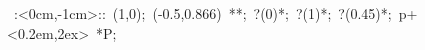 

\hbox{
\xy    <8cm,0cm>:<0cm,-1cm>::
       (1,0); (-0.5,0.866) **\dir{-}; ?(0)*\dir{<}; ?(1)*\dir{>};
       ?(0.45)*{\bullet}; p+<0.2em,2ex> *{P};
\endxy}

